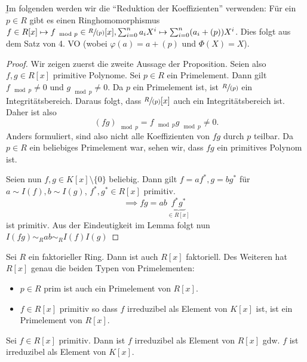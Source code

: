 \b
Im folgenden werden wir die \enquote{Reduktion der Koeffizienten} verwenden:
Für ein $p \in R$ gibt es einen Ringhomomorphismus $f \in R[x] \mapsto f_{\mod p} \in \sfrac{R}{(p)}[x], \sum_{i=0}^{n} a_{i} X^{i} \mapsto \sum_{i=0}^{n} (a_{i} + (p)) X^{i}$.
Dies folgt aus dem Satz von 4. VO %
(wobei $\varphi(a) = a + (p)$ und $\Phi(X) = X$).

\begin{proof}
	 Wir zeigen zuerst die zweite Aussage der Proposition.
	 Seien also $f,g \in R[x]$ primitive Polynome.
	 Sei $p \in R$ ein Primelement. Dann gilt $f_{\mod p} \neq 0$ und $g_{\mod p} \neq 0$.
	 Da $p$ ein Primelement ist, ist $\sfrac{R}{(p)}$ ein Integritätsbereich.
	 Daraus folgt, dass $\sfrac{R}{(p)}[x]$ auch ein Integritätsbereich ist.
	 Daher ist also
	 \[
		 (fg)_{\mod p} = f_{\mod p} g _{\mod p} \neq 0
	 .\]
	 Anders formuliert, sind also nicht alle Koeffizienten von $fg$ durch $p$ teilbar.
	 Da $p \in R$ ein beliebiges Primelement war, sehen wir, dass $fg$ ein primitives Polynom ist.

	 Seien nun $f,g \in K[x] \setminus \{0\} $ beliebig.
	 Dann gilt $f = a f^{*}, g = b g^{*}$ für $a \sim I(f), b \sim I(g)$, $f^{*},g^{*} \in R[x]$ primitiv.
	  \[
		  \implies fg = ab \underbrace{f^{*}g^{*}}_{\in R[x]}
	 \] 
	 ist primitiv.
	 Aus der Eindeutigkeit im Lemma folgt nun $I(fg) \sim_{R} ab \sim_{R} I(f) I(g)$
\end{proof}

\begin{theorem}[Gauss]
	Sei $R$ ein faktorieller Ring. Dann ist auch $R[x]$ faktoriell.
	Des Weiteren hat $R[x]$ genau die beiden Typen von Primelementen:
	\begin{itemize}
		\item $p \in R$ prim ist auch ein Primelement von $R[x]$.
		\item $f \in R[x]$ primitiv so dass $f$ irreduzibel als Element von $K[x]$ ist,
			ist ein Primelement von $R[x]$.
	\end{itemize}
\end{theorem}

\begin{corollary}
	Sei $f \in R[x]$ primitiv. Dann ist $f$ irreduzibel als Element von $R[x]$ gdw. $f$ ist irreduzibel als Element von $K[x]$.
\end{corollary}

